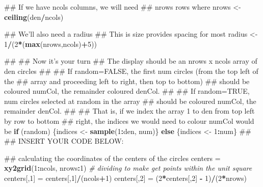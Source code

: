 \documentclass[9pt,letter]{article}
\newenvironment{Shaded}{\begin{snugshade}}{\end{snugshade}}
\newcommand{\KeywordTok}[1]{\textcolor[rgb]{0.13,0.29,0.53}{\textbf{#1}}}
\newcommand{\DecValTok}[1]{\textcolor[rgb]{0.00,0.00,0.81}{#1}}
\newcommand{\StringTok}[1]{\textcolor[rgb]{0.31,0.60,0.02}{#1}}
\newcommand{\CommentTok}[1]{\textcolor[rgb]{0.56,0.35,0.01}{\textit{#1}}}
\newcommand{\ControlFlowTok}[1]{\textcolor[rgb]{0.13,0.29,0.53}{\textbf{#1}}}
\newcommand{\OperatorTok}[1]{\textcolor[rgb]{0.81,0.36,0.00}{\textbf{#1}}}
\newcommand{\NormalTok}[1]{#1}
\begin{document}
\begin{enumerate}
\begin{Shaded}
\begin{Highlighting}[]
\NormalTok{  ## If we have ncols columns, we will need}
\NormalTok{  ## nrows rows where}
\NormalTok{  nrows <-}\StringTok{ }\KeywordTok{ceiling}\NormalTok{(den}\OperatorTok{/}\NormalTok{ncols)}

\NormalTok{  ## We'll also need a radius}
\NormalTok{  ## This is size provides spacing for most}
\NormalTok{  radius <-}\StringTok{ }\DecValTok{1}\OperatorTok{/}\NormalTok{(}\DecValTok{2}\OperatorTok{*}\NormalTok{(}\KeywordTok{max}\NormalTok{(nrows,ncols)}\OperatorTok{+}\DecValTok{5}\NormalTok{))}

\NormalTok{  ##}
\NormalTok{  ## Now it's your turn}
\NormalTok{  ## The display should be an nrows x ncols array of den circles}
\NormalTok{  ## }
\NormalTok{  ## If random=FALSE, the first num circles (from the top left of the}
\NormalTok{  ## array and proceeding left to right, then top to bottom) }
\NormalTok{  ## should be coloured numCol, the remainder coloured denCol.}
\NormalTok{  ## }
\NormalTok{  ## If random=TRUE, num circles selected at random in the array}
\NormalTok{  ## should be coloured numCol, the remainder denCol.}
\NormalTok{  ## }
\NormalTok{  ## That is, if we index the array 1 to den from top left by row to bottom}
\NormalTok{  ## right, the indices we would need to colour numCol would be}
  \ControlFlowTok{if}\NormalTok{ (random) \{indices <-}\StringTok{ }\KeywordTok{sample}\NormalTok{(}\DecValTok{1}\OperatorTok{:}\NormalTok{den, num)\} }\ControlFlowTok{else}\NormalTok{ \{indices <-}\StringTok{ }\DecValTok{1}\OperatorTok{:}\NormalTok{num\}}
\NormalTok{  ##}
\NormalTok{  ## INSERT YOUR CODE BELOW:}

\NormalTok{  ## calculating the coordinates of the centers of the circles}
\NormalTok{  centers =}\StringTok{ }\KeywordTok{xy2grid}\NormalTok{(}\DecValTok{1}\OperatorTok{:}\NormalTok{ncols, nrows}\OperatorTok{:}\DecValTok{1}\NormalTok{)}
  \CommentTok{# dividing to make get points within the unit square}
\NormalTok{  centers[,}\DecValTok{1}\NormalTok{] =}\StringTok{ }\NormalTok{centers[,}\DecValTok{1}\NormalTok{]}\OperatorTok{/}\NormalTok{(ncols}\OperatorTok{+}\DecValTok{1}\NormalTok{)}
\NormalTok{  centers[,}\DecValTok{2}\NormalTok{] =}\StringTok{ }\NormalTok{(}\DecValTok{2}\OperatorTok{*}\NormalTok{centers[,}\DecValTok{2}\NormalTok{] }\OperatorTok{-}\StringTok{ }\DecValTok{1}\NormalTok{)}\OperatorTok{/}\NormalTok{(}\DecValTok{2}\OperatorTok{*}\NormalTok{nrows)}


\end{Highlighting}
\end{Shaded}
\end{enumerate}
\end{document}

